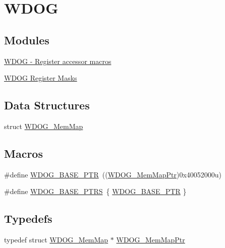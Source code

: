\hypertarget{group___w_d_o_g___peripheral}{}\section{W\+D\+O\+G}
\label{group___w_d_o_g___peripheral}
\subsection*{Modules}
\begin{DoxyCompactItemize}
\item 
\hyperlink{group___w_d_o_g___register___accessor___macros}{W\+D\+O\+G -\/ Register accessor macros}
\item 
\hyperlink{group___w_d_o_g___register___masks}{W\+D\+O\+G Register Masks}
\end{DoxyCompactItemize}
\subsection*{Data Structures}
\begin{DoxyCompactItemize}
\item 
struct \hyperlink{struct_w_d_o_g___mem_map}{W\+D\+O\+G\+\_\+\+Mem\+Map}
\end{DoxyCompactItemize}
\subsection*{Macros}
\begin{DoxyCompactItemize}
\item 
\#define \hyperlink{group___w_d_o_g___peripheral_ga72fb27c7bc1ae124f180d8f2c7b9fa79}{W\+D\+O\+G\+\_\+\+B\+A\+S\+E\+\_\+\+P\+T\+R}~((\hyperlink{group___w_d_o_g___peripheral_gaed99974fa14a19f21a8770728ff09af3}{W\+D\+O\+G\+\_\+\+Mem\+Map\+Ptr})0x40052000u)
\item 
\#define \hyperlink{group___w_d_o_g___peripheral_ga8d50dba3756857eed1783b3d726d40d8}{W\+D\+O\+G\+\_\+\+B\+A\+S\+E\+\_\+\+P\+T\+R\+S}~\{ \hyperlink{group___w_d_o_g___peripheral_ga72fb27c7bc1ae124f180d8f2c7b9fa79}{W\+D\+O\+G\+\_\+\+B\+A\+S\+E\+\_\+\+P\+T\+R} \}
\end{DoxyCompactItemize}
\subsection*{Typedefs}
\begin{DoxyCompactItemize}
\item 
typedef struct \hyperlink{struct_w_d_o_g___mem_map}{W\+D\+O\+G\+\_\+\+Mem\+Map} $\ast$ \hyperlink{group___w_d_o_g___peripheral_gaed99974fa14a19f21a8770728ff09af3}{W\+D\+O\+G\+\_\+\+Mem\+Map\+Ptr}
\end{DoxyCompactItemize}


